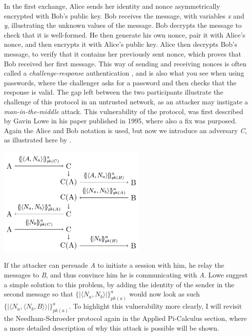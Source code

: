 In the first exchange, Alice sends her identity and nonce asymmetrically encrypted with Bob's public key. Bob receives the message, with variables \textit{x} and \textit{y}, illustrating the unknown values of the message. Bob decrypts the message to check that it is well-formed. He then generate his own nonce, pair it with Alice's nonce, and then encrypts it with Alice's public key. Alice then decrypts Bob's message, to verify that it contains her previously sent nonce, which proves that Bob received her first message. 
This way of sending and receiving nonces is often called a \textit{challenge-response} authentication \autocite{DBLP:journals/ftpl/CortierK14}, and is also what you see when using passwords, where the challenger asks for a password and then checks that the response is valid. 
\bigbreak
The gap left between the two participants illustrate the challenge of this protocol in an untrusted network, as an attacker may instigate a \textit{man-in-the-middle} attack. This vulnerability of the protocol, was first described by Gavin Lowe in his paper published in 1995, where also a fix was purposed. Again the Alice and Bob notation is used, but now we introduce an adversary \textit{C}, as illustrated here by \citeauthor{DBLP:journals/ftpl/CortierK14}.

\begin{center}
\includegraphics[width=0.55\textwidth, angle=0]{Graphics/Challenge.pdf}
\end{center}

If the attacker can persuade \textit{A} to initiate a session with him, he relay the messages to \textit{B}, and thus convince him he is communicating with \textit{A}. Lowe suggest a simple solution to this problem, by adding the identity of the sender in the second message so that $\{|\langle N_a, N_b\rangle |\}^a_{pk(a)}$ would now look as such $\{|\langle N_a, \langle N_b, B\rangle \rangle |\}^a_{pk(a)}$. To highlight this vulnerability more clearly, I will revisit the Needham-Schroeder protocol again in the Applied Pi-Calculus section, where a more detailed description of why this attack is possible will be shown. 


